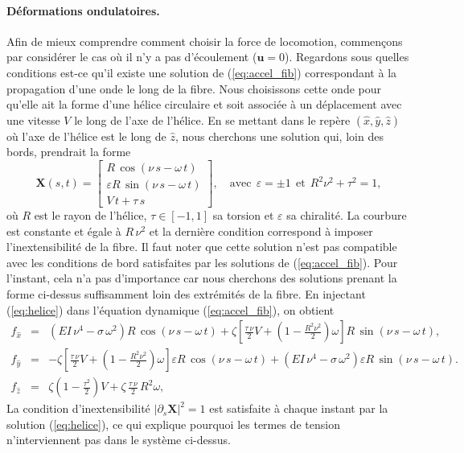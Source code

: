 \documentclass[a4paper,11pt]{article}
\begin{document}
\paragraph{Déformations ondulatoires.} Afin de mieux comprendre comment choisir la force de locomotion, commençons par considérer le cas où il n'y a pas d'écoulement ($\bm u=0$). Regardons sous quelles conditions est-ce qu'il existe une solution de (\ref{eq:accel_fib}) correspondant à la propagation d'une onde le long de la fibre.  Nous choisissons cette onde pour qu'elle ait la forme d'une hélice circulaire et soit associée à un déplacement avec une vitesse $V$ le long de l'axe de l'hélice. En se mettant dans le repère $(\hat{x},\hat{y},\hat{z})$ où l'axe de l'hélice est le long de $\hat{z}$, nous cherchons une solution qui, loin des bords, prendrait la forme
\begin{equation}
  \bm X(s,t) = \left[ \begin{array}{c} R\,\cos(\nu\,s-\omega\,t) \\ \varepsilon R\,\sin(\nu\,s-\omega\,t)\\  V\,t+\tau\,s\end{array}\right]\!,\quad\mbox{avec}\ \ \varepsilon = \pm 1 \ \ \mbox{et}\ \ R^2\nu^2+\tau^2 = 1,
  \label{eq:helice}
\end{equation}
où $R$ est le rayon de l'hélice, $\tau\in[-1,1]$ sa torsion et $\varepsilon$ sa chiralité.  La courbure est constante et égale à $R\,\nu^2$ et la dernière condition correspond à imposer  l'inextensibilité de la fibre. Il faut noter que cette solution n'est pas compatible avec les conditions de bord satisfaites par les solutions de (\ref{eq:accel_fib}). Pour l'instant, cela n'a pas d'importance car nous cherchons des solutions prenant la forme ci-dessus suffisamment loin des extrémités de la fibre. En injectant (\ref{eq:helice}) dans l'équation dynamique (\ref{eq:accel_fib}), on obtient
\begin{eqnarray}
  f_{\hat{x}} &=& \left(EI\,\nu^4-\sigma\,\omega^2\right) R\,\cos(\nu\,s-\omega\,t) + \zeta \left[\frac{\tau\,\nu}{2}V+\left(1-\frac{R^2\nu^2}{2}\right) \omega\right]R\,\sin(\nu\,s-\omega\,t),\\
  f_{\hat{y}}&=& -\zeta \left[\frac{\tau\,\nu}{2}V+\left(1-\frac{R^2\nu^2}{2}\right) \omega\right]\varepsilon R\, \cos(\nu\,s-\omega\,t)+\left(EI\,\nu^4-\sigma\,\omega^2\right) \varepsilon R\,\sin(\nu\,s-\omega\,t).\\
   f_{\hat{z}} &=& \zeta\left(1-\frac{\tau^2}{2}\right)V +\zeta\,\frac{\tau\,\nu}{2}\,R^2\omega,
 \end{eqnarray}
La condition d'inextensibilité $|\partial_s\bm X|^2 = 1$ est satisfaite à chaque instant par la solution  (\ref{eq:helice}), ce qui explique pourquoi les termes de tension n'interviennent pas dans le système ci-dessus.
\end{document}

